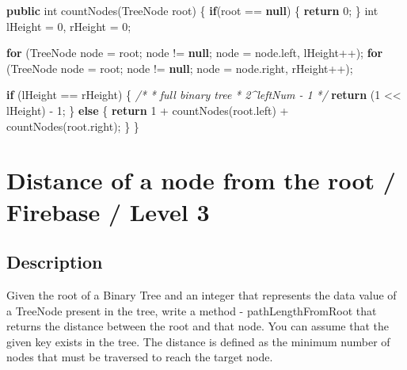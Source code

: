 \documentclass[]{book}
\newenvironment{Shaded}{\begin{snugshade}}{\end{snugshade}}
\newcommand{\BuiltInTok}[1]{#1}
\newcommand{\CommentTok}[1]{\textcolor[rgb]{0.56,0.35,0.01}{\textit{#1}}}
\newcommand{\DataTypeTok}[1]{\textcolor[rgb]{0.13,0.29,0.53}{#1}}
\newcommand{\DecValTok}[1]{\textcolor[rgb]{0.00,0.00,0.81}{#1}}
\newcommand{\FunctionTok}[1]{\textcolor[rgb]{0.00,0.00,0.00}{#1}}
\newcommand{\KeywordTok}[1]{\textcolor[rgb]{0.13,0.29,0.53}{\textbf{#1}}}
\newcommand{\NormalTok}[1]{#1}
\begin{document}
\begin{Shaded}
\begin{Highlighting}[]
\KeywordTok{public} \DataTypeTok{int} \FunctionTok{countNodes}\NormalTok{(}\BuiltInTok{TreeNode}\NormalTok{ root) \{}
    \KeywordTok{if}\NormalTok{(root == }\KeywordTok{null}\NormalTok{) \{}
        \KeywordTok{return} \DecValTok{0}\NormalTok{;}
\NormalTok{    \}}
    \DataTypeTok{int}\NormalTok{ lHeight = }\DecValTok{0}\NormalTok{, rHeight = }\DecValTok{0}\NormalTok{;}

    \KeywordTok{for}\NormalTok{ (}\BuiltInTok{TreeNode}\NormalTok{ node = root; node != }\KeywordTok{null}\NormalTok{; node = node.}\FunctionTok{left}\NormalTok{, lHeight++);}
    \KeywordTok{for}\NormalTok{ (}\BuiltInTok{TreeNode}\NormalTok{ node = root; node != }\KeywordTok{null}\NormalTok{; node = node.}\FunctionTok{right}\NormalTok{, rHeight++);}

    \KeywordTok{if}\NormalTok{ (lHeight == rHeight) \{}
        \CommentTok{/*}
\CommentTok{        * full binary tree}
\CommentTok{        * 2^leftNum - 1}
\CommentTok{        */}
        \KeywordTok{return}\NormalTok{ (}\DecValTok{1}\NormalTok{ << lHeight) - }\DecValTok{1}\NormalTok{;}
\NormalTok{    \} }\KeywordTok{else}\NormalTok{ \{}
        \KeywordTok{return} \DecValTok{1}\NormalTok{ + }\FunctionTok{countNodes}\NormalTok{(root.}\FunctionTok{left}\NormalTok{) + }\FunctionTok{countNodes}\NormalTok{(root.}\FunctionTok{right}\NormalTok{);}
\NormalTok{    \}}
\NormalTok{\}}
\end{Highlighting}
\end{Shaded}

\hypertarget{distance-of-a-node-from-the-root-firebase-level-3}{%
\section{Distance of a node from the root / Firebase / Level 3}\label{distance-of-a-node-from-the-root-firebase-level-3}}

\hypertarget{description-58}{%
\subsection{Description}\label{description-58}}

Given the root of a Binary Tree and an integer that represents the data value of a TreeNode present in the tree,
write a method - pathLengthFromRoot that returns the distance between the root and that node. You can assume that the
given key exists in the tree. The distance is defined as the minimum number of nodes that must be traversed to reach
the target node.
\end{document}
